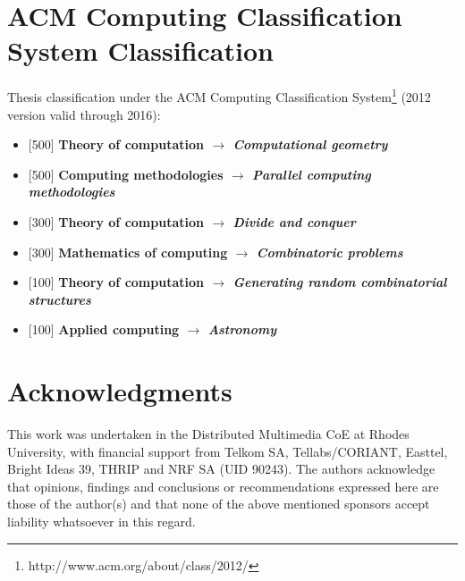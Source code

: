 \begin{abstract}

\end{abstract}

\chapter*{ACM Computing Classification System Classification}
Thesis classification under the ACM Computing Classification System\footnote{http://www.acm.org/about/class/2012/} (2012 version valid through 2016):

\begin{itemize}
\item {[500] \bf{Theory of computation} $\rightarrow$ \em {Computational geometry} }
\item {[500] \bf{Computing methodologies} $\rightarrow$ \em {Parallel computing methodologies} }
\item {[300] \bf{Theory of computation} $\rightarrow$ \em {Divide and conquer} }
\item {[300] \bf{Mathematics of computing} $\rightarrow$ \em {Combinatoric problems} }
\item {[100] \bf{Theory of computation} $\rightarrow$ \em {Generating random combinatorial structures} }
\item {[100] \bf{Applied computing} $\rightarrow$ \em {Astronomy} }
\end{itemize}

\chapter*{Acknowledgments}
This work was undertaken in the Distributed Multimedia CoE at Rhodes University, with financial support from Telkom SA, Tellabs/CORIANT, Easttel, Bright Ideas 39, THRIP and NRF SA (UID 90243).  The authors acknowledge that opinions, findings and conclusions or recommendations expressed here are those of the author(s) and that none of the above mentioned sponsors accept liability whatsoever in this regard.